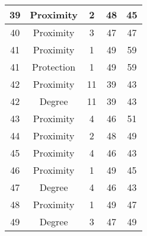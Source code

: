 \documentclass[results.tex]{subfiles}
\begin{document}
\begin{center}
\begin{tabular}{| c || c | c | c | c |}
    \hline
    39 & Proximity & 2 & 48 & 45 \\ 
    \hline
    40 & Proximity & 3 & 47 & 47 \\ 
    \hline
    41 & Proximity & 1 & 49 & 59 \\ 
    \hline
    41 & Protection & 1 & 49 & 59 \\ 
    \hline
    42 & Proximity & 11 & 39 & 43 \\ 
    \hline
    42 & Degree & 11 & 39 & 43 \\ 
    \hline
    43 & Proximity & 4 & 46 & 51 \\ 
    \hline
    44 & Proximity & 2 & 48 & 49 \\ 
    \hline
    45 & Proximity & 4 & 46 & 43 \\ 
    \hline
    46 & Proximity & 1 & 49 & 45 \\ 
    \hline
    47 & Degree & 4 & 46 & 43 \\ 
    \hline
    48 & Proximity & 1 & 49 & 47 \\ 
    \hline
    49 & Degree & 3 & 47 & 49 \\ 
    \hline   \end{tabular}
\end{center}
\end{document}
